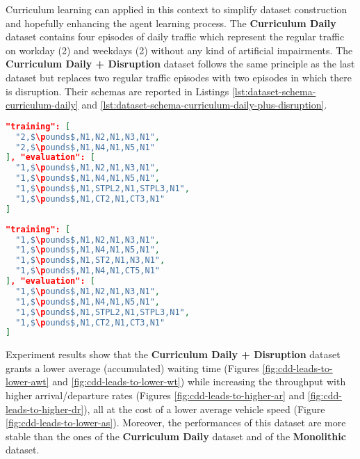 Curriculum learning can applied in this context to simplify dataset construction and hopefully enhancing the agent learning process.
The \textbf{Curriculum Daily} dataset contains four episodes of daily traffic which represent the regular traffic on workday (2) and weekdays (2) without any kind of artificial impairments.
The \textbf{Curriculum Daily + Disruption} dataset follows the same principle as the last dataset but replaces two regular traffic episodes with two episodes in which there is disruption.
Their schemas are reported in Listings \ref{lst:dataset-schema-curriculum-daily} and \ref{lst:dataset-schema-curriculum-daily-plus-disruption}.

\noindent
\begin{minipage}{\linewidth}
\begin{lstlisting}[language=JSON, caption=The schema for the "Curriculum Daily" Dataset, label={lst:dataset-schema-curriculum-daily}, mathescape=true]
"training": [
  "2,$\pounds$,N1,N2,N1,N3,N1",
  "2,$\pounds$,N1,N4,N1,N5,N1"
], "evaluation": [
  "1,$\pounds$,N1,N2,N1,N3,N1",
  "1,$\pounds$,N1,N4,N1,N5,N1",
  "1,$\pounds$,N1,STPL2,N1,STPL3,N1",
  "1,$\pounds$,N1,CT2,N1,CT3,N1"
]
\end{lstlisting}
\end{minipage}

\noindent
\begin{minipage}{\linewidth}
\begin{lstlisting}[language=JSON, caption=The schema for the "Curriculum Daily + Disruption" Dataset, label={lst:dataset-schema-curriculum-daily-plus-disruption}, mathescape=true]
"training": [
  "1,$\pounds$,N1,N2,N1,N3,N1",
  "1,$\pounds$,N1,N4,N1,N5,N1",
  "1,$\pounds$,N1,ST2,N1,N3,N1",
  "1,$\pounds$,N1,N4,N1,CT5,N1"
], "evaluation": [
  "1,$\pounds$,N1,N2,N1,N3,N1",
  "1,$\pounds$,N1,N4,N1,N5,N1",
  "1,$\pounds$,N1,STPL2,N1,STPL3,N1",
  "1,$\pounds$,N1,CT2,N1,CT3,N1"
]
\end{lstlisting}
\end{minipage}

Experiment results show that the \textbf{Curriculum Daily + Disruption} dataset grants a lower average (accumulated) waiting time (Figures \ref{fig:cdd-leads-to-lower-awt} and \ref{fig:cdd-leads-to-lower-wt}) while increasing the throughput with higher arrival/departure rates (Figures \ref{fig:cdd-leads-to-higher-ar} and \ref{fig:cdd-leads-to-higher-dr}), all at the cost of a lower average vehicle speed (Figure \ref{fig:cdd-leads-to-lower-as}). Moreover, the performances of this dataset are more stable than the ones of the \textbf{Curriculum Daily} dataset and of the \textbf{Monolithic} dataset.

